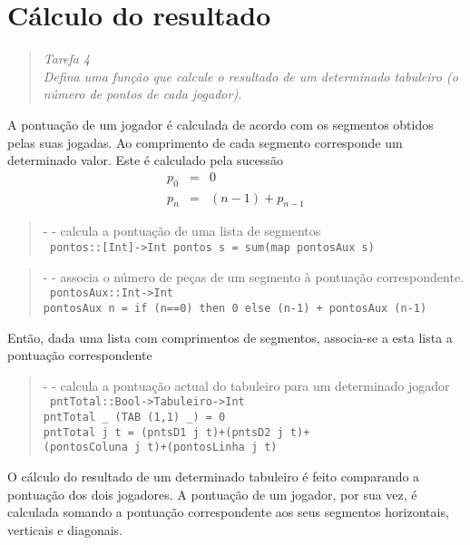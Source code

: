 \documentclass[a4paper,titlepage]{scrreprt}
\begin{document}
\chapter{Cálculo do resultado}
	\begin{quote}
		\begin{center}
			{\it
			Tarefa 4\\
			Defina uma função que calcule o resultado de um determinado tabuleiro (o número de pontos de cada jogador).
			}
		\end{center}
	\end{quote}
	A pontuação de um jogador é calculada de acordo com os segmentos obtidos pelas suas jogadas. Ao comprimento de cada segmento corresponde um
	determinado valor. Este é calculado pela sucessão
	\begin{eqnarray*}
		p_0 &=& 0\\
		p_n &=&(n-1)+p_{n-1}
	\end{eqnarray*}
	\begin{quote}
		{\small - - calcula a pontuação de uma lista de segmentos\\}
		{\tt
		pontos::[Int]->Int
		pontos s = sum(map pontosAux s)
		}
	\end{quote}
	\begin{quote}
		{\small - - associa o número de peças de um segmento à pontuação correspondente.\\}
		{\tt
		pontosAux::Int->Int\\
		pontosAux n = if (n==0) then 0 else (n-1) + pontosAux (n-1)
		}
	\end{quote}
	Então, dada uma lista com comprimentos de segmentos, associa-se a esta lista a pontuação correspondente
	\begin{quote}
		{\small - - calcula a pontuação actual do tabuleiro para um determinado jogador\\}
		{\tt
		pntTotal::Bool->Tabuleiro->Int\\
		pntTotal \_ (TAB (1,1) \_) = 0\\
		pntTotal j t = (pntsD1 j t)+(pntsD2 j t)+\\(pontosColuna j t)+(pontosLinha j t)
		}
	\end{quote}
O cálculo do resultado de um determinado tabuleiro é feito comparando a pontuação dos dois jogadores. A pontuação de um jogador,
por sua vez, é calculada somando a pontuação correspondente aos seus segmentos horizontais, verticais e diagonais.
\end{document}
